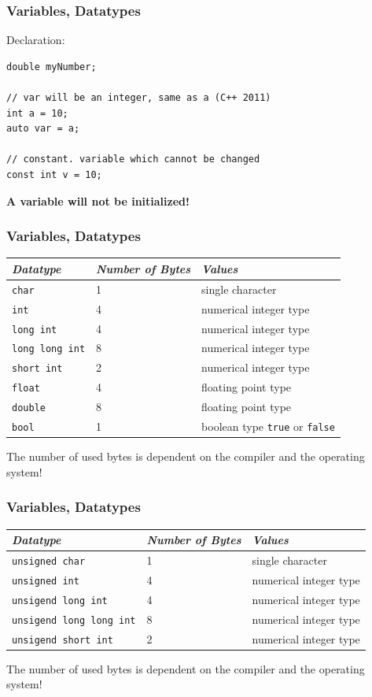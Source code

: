 \begin{frame}[fragile]
  \frametitle{Variables, Datatypes}
  Declaration:
  {\small
\begin{lstlisting}
double myNumber;

// var will be an integer, same as a (C++ 2011)
int a = 10;
auto var = a;

// constant. variable which cannot be changed
const int v = 10;
\end{lstlisting}
}
  {\bf A variable will not be initialized!}
\end{frame}

\begin{frame}[fragile]
  \frametitle{Variables, Datatypes}
  {\scriptsize
  \begin{tabular}{|l|l|l|}
  \hline
  \emph{Datatype} & \emph{Number of Bytes} & \emph{Values} \\
  \hline
  \verb|char| & 1 & single character\\
  \verb|int| & 4 & numerical integer type\\
  \verb|long int| & 4 & numerical integer type\\
  \verb|long long int| & 8 & numerical integer type\\
  \verb|short int| & 2 & numerical integer type\\
  \verb|float| & 4 & floating point type\\
  \verb|double| & 8 & floating point type\\
  \verb|bool| & 1 & boolean type \verb|true| or \verb|false|\\
  \hline
  \end{tabular}
  }
  \par
  The number of used bytes is dependent on the compiler and the operating system!
\end{frame}

\begin{frame}[fragile]
  \frametitle{Variables, Datatypes}
  {\scriptsize
  \begin{tabular}{|l|l|l|}
  \hline
  \emph{Datatype} & \emph{Number of Bytes} & \emph{Values} \\
  \hline
  \verb|unsigned char| & 1 & single character\\
  \verb|unsigned int| & 4 & numerical integer type\\
  \verb|unsigend long int| & 4 & numerical integer type\\
  \verb|unsigend long long int| & 8 & numerical integer type\\
  \verb|unsigend short int| & 2 & numerical integer type\\
  \hline
  \end{tabular}
  }
  \par
  The number of used bytes is dependent on the compiler and the operating system!
\end{frame}

